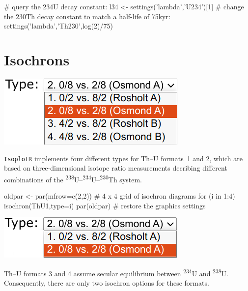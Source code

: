 \begin{refsection}
\begin{script}
# query the 234U decay constant:
l34 <- settings('lambda','U234')[1]
# change the 230Th decay constant to match a half-life of 75kyr:
settings('lambda','Th230',log(2)/75)
\end{script}

\section{Isochrons}\label{sec:ThUisochron-R}

\noindent\begin{minipage}[t]{.3\linewidth}
\strut\vspace*{-\baselineskip}\newline
\includegraphics[width=\linewidth]{../figures/ThUisochron12.png}
\end{minipage}
\begin{minipage}[t]{.7\linewidth}
  \texttt{IsoplotR} implements four different types for Th--U
  formats~1 and 2, which are based on three-dimensional isotope ratio
  measurements decribing different combinations of the
  \textsuperscript{238}U--\textsuperscript{234}U--\textsuperscript{230}Th
  system.
\end{minipage}

\begin{console}
oldpar <- par(mfrow=c(2,2)) # 4 x 4 grid of isochron diagrams
for (i in 1:4){ isochron(ThU1,type=i) }
par(oldpar) # restore the graphics settings
\end{console}

\noindent\begin{minipage}[t]{.3\linewidth}
\strut\vspace*{-\baselineskip}\newline
\includegraphics[width=\linewidth]{../figures/ThUisochron34.png}
\end{minipage}
\begin{minipage}[t]{.7\linewidth}
  Th--U formats 3 and 4 assume secular equilibrium between
  \textsuperscript{234}U and \textsuperscript{238}U. Consequently,
  there are only two isochron options for these formats.
\end{minipage}


\end{refsection}
